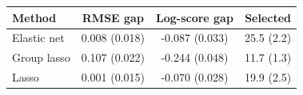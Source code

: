 \begin{tabular}{lccc}
\toprule
Method & RMSE gap & Log-score gap & Selected \\
\midrule
Elastic net & 0.008 (0.018) & -0.087 (0.033) & 25.5 (2.2) \\
Group lasso & 0.107 (0.022) & -0.244 (0.048) & 11.7 (1.3) \\
Lasso & 0.001 (0.015) & -0.070 (0.028) & 19.9 (2.5) \\
\bottomrule
\end{tabular}
